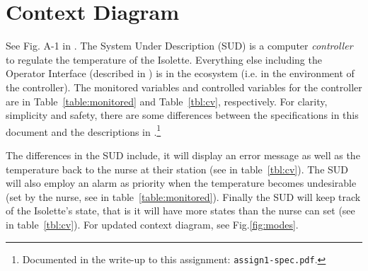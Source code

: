 \section{Context Diagram}
 
See Fig. A-1 in \cite{REMH}. The System Under Description (SUD) is a computer \emph{controller} to regulate the temperature of the Isolette. Everything else including the Operator Interface (described in \cite{REMH}) is in the ecosystem (i.e. in the environment of the controller). The monitored variables and controlled variables for the controller are in Table~\ref{table:monitored} and 
Table~\ref{tbl:cv}, respectively. For clarity, simplicity and safety, there are some differences between the specifications in this document and the descriptions in \cite{REMH}.\footnote{%
Documented in the write-up to this assignment: \texttt{assign1-spec.pdf}.} 

The differences in the SUD include, it will display an error message as well as the temperature back to the nurse at their station (see \emph{} in table~\ref{tbl:cv}). The SUD will also employ an alarm as priority when the temperature becomes undesirable (set by the nurse, see  in table~\ref{table:monitored}). Finally the SUD will keep track of the Isolette's state, that is it will have more states than the nurse can set (see \emph{} in table~\ref{tbl:cv}). For updated context diagram, see Fig.\ref{fig:modes}.